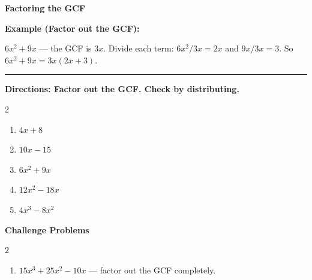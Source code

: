\documentclass[12pt]{article}
\begin{document}
\vspace{0.35cm}

\begin{center}{\Large \textbf{Factoring the GCF}}\end{center}\vspace{0.25cm}
\textbf{Example (Factor out the GCF):}

$6x^{2}+9x$ — the GCF is $3x$. Divide each term: $6x^{2}/3x=2x$ and $9x/3x=3$. So $6x^{2}+9x=3x(2x+3)$.

\vspace{0.3cm}\hrule\vspace{0.4cm}
\textbf{Directions: Factor out the GCF. Check by distributing.}

\begin{multicols}{2}
\begin{enumerate}[label=\textbf{\arabic*.}, start=1, itemsep=2cm]
  \item $\displaystyle 4x+8$
  \item $\displaystyle 10x-15$
  \item $\displaystyle 6x^{2}+9x$
  \item $\displaystyle 12x^{2}-18x$
  \item $\displaystyle 4x^{3}-8x^{2}$
\end{enumerate}
\end{multicols}
\newpage

\begin{center}{\large \textbf{Challenge Problems}}\end{center}\vspace{0.3cm}
\begin{multicols}{2}\begin{enumerate}[label=\textbf{\arabic*.}, start=6, itemsep=2.6cm]
  \item $15x^{3}+25x^{2}-10x$ — factor out the GCF completely.
\end{enumerate}\end{multicols}\newpage
\end{document}
